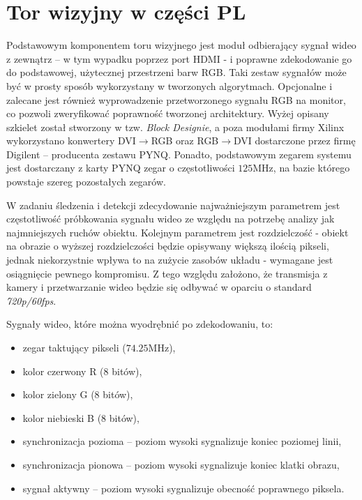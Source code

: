 \section{Tor wizyjny w części PL} %
\label{sec:counter}


Podstawowym komponentem toru wizyjnego jest moduł odbierający sygnał wideo z zewnątrz -- w tym wypadku poprzez port HDMI - i poprawne zdekodowanie go do podstawowej, użytecznej przestrzeni barw RGB. 
Taki zestaw sygnałów może być w prosty sposób wykorzystany w tworzonych algorytmach. %
Opcjonalne i zalecane jest również wyprowadzenie przetworzonego sygnału RGB na monitor, co pozwoli zweryfikować poprawność tworzonej architektury. 
Wyżej opisany szkielet został stworzony w tzw. \textit{Block Designie}, a poza modułami firmy Xilinx wykorzystano konwertery DVI$\rightarrow$RGB oraz RGB$\rightarrow$DVI dostarczone przez firmę Digilent -- producenta zestawu PYNQ. 
Ponadto, podstawowym zegarem systemu jest dostarczany z karty PYNQ zegar o częstotliwości $125$MHz, na bazie którego powstaje szereg pozostałych zegarów. %
 
W zadaniu śledzenia i detekcji zdecydowanie najważniejszym parametrem jest częstotliwość próbkowania sygnału wideo ze względu na potrzebę analizy jak najmniejszych ruchów obiektu. Kolejnym parametrem jest rozdzielczość - obiekt na obrazie o wyższej rozdzielczości będzie opisywany większą ilością pikseli, jednak niekorzystnie wpływa to na zużycie zasobów układu - wymagane jest osiągnięcie pewnego kompromisu. Z tego względu założono, że transmisja z kamery i przetwarzanie wideo będzie się odbywać w oparciu o standard \textit{720p/60fps}.%

Sygnały wideo, które można wyodrębnić po zdekodowaniu, to:
\begin{itemize}
	\item zegar taktujący pikseli ($74.25$MHz),
	\item kolor czerwony R (8 bitów),
	\item kolor zielony G (8 bitów),
	\item kolor niebieski B (8 bitów),
	\item synchronizacja pozioma -- poziom wysoki sygnalizuje koniec poziomej linii,
	\item synchronizacja pionowa -- poziom wysoki sygnalizuje koniec klatki obrazu,
	\item sygnał aktywny -- poziom wysoki sygnalizuje obecność poprawnego piksela.
\end{itemize}

